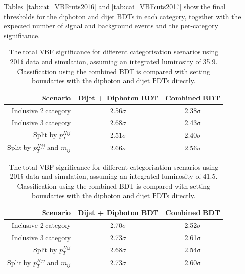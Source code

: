 Tables~\ref{tab:cat_VBFcuts2016} and \ref{tab:cat_VBFcuts2017} show the final thresholds 
for the diphoton and dijet BDTs in each category, 
together with the expected number of signal and background events and the per-category significance.

\newpage

\begin{table}
  \begin{centering}
    \begin{tabular}{ r | c | c }
    \hline
    Scenario                          & Dijet + Diphoton BDT    & Combined BDT   \\
    \hline
    Inclusive 2 category              & 2.56$\sigma$            & 2.38$\sigma$   \\
    Inclusive 3 category              & 2.68$\sigma$            & 2.43$\sigma$   \\
    Split by $p_T^{Hjj}$              & 2.51$\sigma$            & 2.40$\sigma$   \\
    Split by $p_T^{Hjj}$ and $m_{jj}$ & 2.66$\sigma$            & 2.56$\sigma$   \\
    \hline
    \end{tabular}
    \caption{The total VBF significance for different categorisation scenarios 
    using 2016 data and simulation, assuming an integrated luminosity of \SI{35.9}{\fbinv}.
    Classification using the combined BDT is compared with setting boundaries with the 
    diphoton and dijet BDTs directly.}
    \label{tab:cat_VBFscenarios2016}
  \end{centering}
\end{table}

\begin{table}
  \begin{centering}
    \begin{tabular}{ r | c | c }
    \hline
    Scenario                          & Dijet + Diphoton BDT    & Combined BDT   \\
    \hline
    Inclusive 2 category              & 2.70$\sigma$            & 2.52$\sigma$   \\
    Inclusive 3 category              & 2.73$\sigma$            & 2.61$\sigma$   \\
    Split by $p_T^{Hjj}$              & 2.68$\sigma$            & 2.54$\sigma$   \\
    Split by $p_T^{Hjj}$ and $m_{jj}$ & 2.73$\sigma$            & 2.60$\sigma$   \\
    \hline
    \end{tabular}
    \caption{The total VBF significance for different categorisation scenarios 
    using 2016 data and simulation, assuming an integrated luminosity of \SI{41.5}{\fbinv}.
    Classification using the combined BDT is compared with setting boundaries with the 
    diphoton and dijet BDTs directly.}
    \label{tab:cat_VBFscenarios2017}
  \end{centering}
\end{table}

